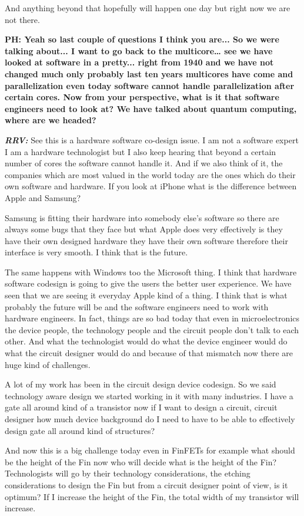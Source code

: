 \begin{multicols}{2}
And anything beyond that hopefully will happen one day but right now we are not there. 

\textbf{PH: Yeah so last couple of questions I think you are... So we were talking about... I want to go back to the multicore… see we have looked at software in a pretty... right from 1940 and we have not changed much only probably last ten years multicores have come and parallelization even today software cannot handle parallelization after certain cores. Now from your perspective, what is it that software engineers need to look at? We have talked about quantum computing, where are we headed?}

\textbf{\textit{RRV:}} See this is a hardware software co-design issue. I am not a software expert I am a hardware technologist but I also keep hearing that beyond a certain number of cores the software cannot handle it. And if we also think of it, the companies which are most valued in the world today are the ones which do their own software and hardware. If you look at iPhone what is the difference between Apple and Samsung?

Samsung is fitting their hardware into somebody else’s software so there are always some bugs that they face but what Apple does very effectively is they have their own designed hardware they have their own software therefore their interface is very smooth. I think that is the future. 

The same happens with Windows too the Microsoft thing. I think that hardware software codesign is going to give the users the better user experience. We have seen that we are seeing it everyday Apple kind of a thing. I think that is what probably the future will be and the software engineers need to work with hardware engineers. In fact, things are so bad today that even in microelectronics the device people, the technology people and the circuit people don’t talk to each other. And what the technologist would do what the device engineer would do what the circuit designer would do and because of that mismatch now there are huge kind of challenges.

A lot of my work has been in the circuit design device codesign. So we said technology aware design we started working in it with many industries. I have a gate all around kind of a transistor now if I want to design a circuit, circuit designer how much device background do I need to have to be able to effectively design gate all around kind of structures? 

And now this is a big challenge today even in FinFETs for example what should be the height of the Fin now who will decide what is the height of the Fin? Technologists will go by their technology considerations, the etching considerations to design the Fin but from a circuit designer point of view, is it optimum? If I increase the height of the Fin, the total width of my transistor will increase.


\end{multicols}
